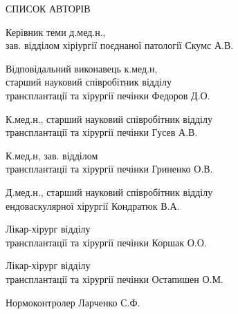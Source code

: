 \thispagestyle{empty}
\begin{center}
    \MakeUppercase{СПИСОК АВТОРІВ}
\end{center}

\noindent
Керівник теми д.мед.н.,\\
зав. відділом хіріургії поєднаної патології  \hfill Скумс А.В.
\vspace{1em}
 
\noindent
Відповідальний виконавець к.мед.н, \\
старший науковий співробітник відділу\\
трансплантації та хірургії печінки \hfill Федоров Д.О.
\vspace{1em}

\noindent
К.мед.н., старший науковий співробітник відділу \\
трансплантації та хірургії печінки \hfill Гусев А.В. 
\vspace{1em}

\noindent
К.мед.н, зав. відділом \\ 
трансплантації та хірургії печінки \hfill Гриненко О.В.
\vspace{1em}

\noindent
Д.мед.н., старший науковий співробітник відділу \\
ендоваскулярної хірургії \hfill Кондратюк В.А.
\vspace{1em}

\noindent
Лікар-хірург відділу\\
трансплантації та хірургії печінки \hfill Коршак О.О.
\vspace{1em}

\noindent
Лікар-хірург відділу\\
трансплантації та хірургії печінки \hfill Остапишен О.М.
\vspace{1em}

\noindent
Нормоконтролер \hfill Ларченко С.Ф.
\vspace{1em}

\newpage